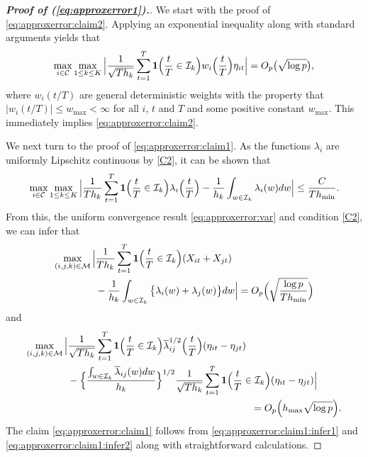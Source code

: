 \documentclass[a4paper,12pt]{article}
\numberwithin{equation}{section}
\begin{document}
\begin{proof}[\textnormal{\textbf{Proof of (\ref{eq:approxerror1}).}}]
We start with the proof of \eqref{eq:approxerror:claim2}. Applying an exponential inequality along with standard arguments yields that 
\begin{equation}\label{eq:approxerror:var}
\max_{i \in \mathcal{C}} \max_{1 \le k \le K} \Big| \frac{1}{\sqrt{Th_k}} \sum\limits_{t=1}^T \boldsymbol{1}\Big(\frac{t}{T} \in \mathcal{I}_k\Big) w_i\Big(\frac{t}{T}\Big) \eta_{it} \Big| = O_p \big( \sqrt{\log p} \big),
\end{equation}
where $w_i(t/T)$ are general deterministic weights with the property that $|w_i(t/T)| \le w_{\max} < \infty$ for all $i$, $t$ and $T$ and some positive constant $w_{\max}$. This immediately implies \eqref{eq:approxerror:claim2}.


We next turn to the proof of \eqref{eq:approxerror:claim1}. As the functions $\lambda_i$ are uniformly Lipschitz continuous by \ref{C2}, it can be shown that 
\begin{equation}\label{eq:approxerror:bias}
\max_{i \in \mathcal{C}} \max_{1 \le k \le K} \Big| \frac{1}{Th_k} \sum\limits_{t=1}^T \boldsymbol{1}\Big(\frac{t}{T} \in \mathcal{I}_k\Big) \lambda_i \Big(\frac{t}{T}\Big) - \frac{1}{h_k} \int_{w \in \mathcal{I}_k} \lambda_i(w) dw \Big| \le \frac{C}{T h_{\min}}.
\end{equation}
From this, the uniform convergence result \eqref{eq:approxerror:var} and condition \ref{C2}, we can infer that 
\begin{align}
 \max_{(i,j,k) \in \mathcal{M}} \Big| & \frac{1}{Th_k} \sum\limits_{t=1}^T \boldsymbol{1}\Big(\frac{t}{T} \in \mathcal{I}_k\Big) (X_{it} + X_{jt}) \nonumber \\* & - \frac{1}{h_k} \int_{w \in \mathcal{I}_k} \big\{ \lambda_i(w) + \lambda_j(w) \big\} dw \Big| = O_p \Big( \sqrt{\frac{\log p}{T h_{\min}}} \Big) \label{eq:approxerror:claim1:infer1} 
\end{align}
and
\begin{align}
 \max_{(i,j,k) \in \indexset} \Big| & \frac{1}{\sqrt{Th_k}} \sum\limits_{t=1}^T \ind\Big(\frac{t}{T} \in \mathcal{I}_k\Big) \overline{\lambda}_{ij}^{1/2}\Big(\frac{t}{T}\Big) (\eta_{it} - \eta_{jt}) \nonumber \\* & - \Big\{\frac{\int_{w \in \mathcal{I}_k} \overline{\lambda}_{ij}(w) dw}{h_k}\Big\}^{1/2} \frac{1}{\sqrt{Th_k}} \sum\limits_{t=1}^T \ind\Big(\frac{t}{T} \in \mathcal{I}_k\Big) (\eta_{it} - \eta_{jt}) \Big| \nonumber \\ & \hspace{6.5cm} = O_p \Big( h_{\max} \sqrt{\log p} \Big). \label{eq:approxerror:claim1:infer2}
\end{align}
The claim \eqref{eq:approxerror:claim1} follows from \eqref{eq:approxerror:claim1:infer1} and \eqref{eq:approxerror:claim1:infer2} along with straightforward calculations.
\end{proof}
\end{document}
